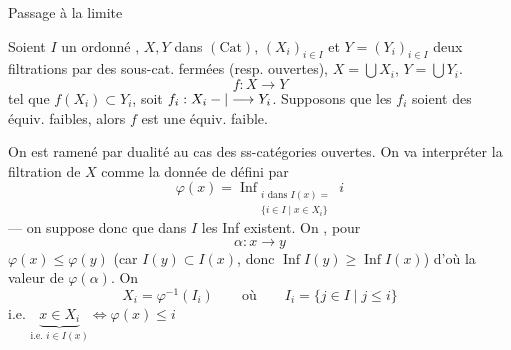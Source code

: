 Passage à la limite

\uline{} Soient $I$ un ordonné , $X,Y$ dans $(\mathrm{Cat})$, $(X_i)_{i\in I}$ et $Y=(Y_i)_{i\in I}$ deux filtrations par des sous-cat. fermées (resp. ouvertes),  $X=\bigcup X_i$, $Y=\bigcup Y_i$.
\[
f:X\longrightarrow Y
\]
tel que $f(X_i)\subset Y_i$, soit $f_i:X_i\mathbin{-}|\longrightarrow Y_i$.
Supposons que les $f_i$ soient des équiv. faibles, alors $f$ est une équiv. faible.


On est ramené par dualité au cas des ss-catégories ouvertes. On va  interpréter la filtration de $X$ comme la donnée de
défini par
\[
\varphi(x)=\operatorname{Inf}_{\substack{i\text{ dans }I(x)=\\\{i\in I\mid x\in X_i\}}}i
\]
--- on suppose donc que dans $I$ les Inf  existent. On  , pour
\[
\alpha:x\longrightarrow y
\]
$\varphi(x)\leq\varphi(y)$ (car $I(y)\subset I(x)$, donc $\operatorname{Inf}I(y)\geq\operatorname{Inf}I(x)$) d'où la valeur de $\varphi(\alpha)$. On  
\[
X_i=\varphi^{-1}(I_i)\qquad\text{où}\qquad I_i=\{j\in I\mid j\leq i\}
\]
\deleted{\unsure{$\varphi$}} i.e. $\underbrace{x\in X_i}_{\text{i.e. }i\in I(x)}\Longleftrightarrow\varphi(x)\leq i$

